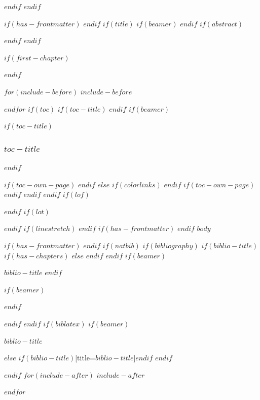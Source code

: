 \documentclass[
$if(fontsize)$
  $fontsize$,
$endif$
$if(papersize)$
  $papersize$paper,
$else$
  paper=a4,
$endif$
$if(beamer)$
  ignorenonframetext,
$if(handout)$
  handout,
$endif$
$if(aspectratio)$
  aspectratio=$aspectratio$,
$endif$
$endif$
$for(classoption)$
  $classoption$$sep$,
$endfor$
  ,captions=tableheading
]{$if(beamer)$$documentclass$$else$$if(book)$scrbook$else$scrartcl$endif$$endif$}
\newif\ifbibliography
\begin{document}
\restoregeometry
{}
$endif$
$endif$


$if(has-frontmatter)$
\frontmatter
$endif$
$if(title)$
$if(beamer)$
\frame{\titlepage}
$endif$
$if(abstract)$
\begin{abstract}
$abstract$
\end{abstract}
$endif$
$endif$

$if(first-chapter)$
\setcounter{chapter}{$first-chapter$}
\addtocounter{chapter}{-1}
$endif$

$for(include-before)$
$include-before$

$endfor$
$if(toc)$
$if(toc-title)$
\renewcommand*\contentsname{$toc-title$}
$endif$
$if(beamer)$
\begin{frame}[allowframebreaks]
$if(toc-title)$
  \frametitle{$toc-title$}
$endif$
  \tableofcontents[hideallsubsections]
\end{frame}
$if(toc-own-page)$
\newpage
$endif$
$else$
{
$if(colorlinks)$
\hypersetup{linkcolor=$if(toccolor)$$toccolor$$else$$endif$}
$endif$
\setcounter{tocdepth}{$toc-depth$}
\tableofcontents
$if(toc-own-page)$
\newpage
$endif$
}
$endif$
$endif$
$if(lof)$
\listoffigures
$endif$
$if(lot)$
\listoftables
$endif$
$if(linestretch)$
$endif$
$if(has-frontmatter)$
\mainmatter
$endif$
$body$

$if(has-frontmatter)$
\backmatter
$endif$
$if(natbib)$
$if(bibliography)$
$if(biblio-title)$
$if(has-chapters)$
\renewcommand\bibname{$biblio-title$}
$else$
\renewcommand\refname{$biblio-title$}
$endif$
$endif$
$if(beamer)$
\begin{frame}[allowframebreaks]{$biblio-title$}
  \bibliographytrue
$endif$
  
$if(beamer)$
\end{frame}
$endif$

$endif$
$endif$
$if(biblatex)$
$if(beamer)$
\begin{frame}[allowframebreaks]{$biblio-title$}
  \bibliographytrue
  \printbibliography[heading=none]
\end{frame}
$else$
\printbibliography$if(biblio-title)$[title=$biblio-title$]$endif$
$endif$

$endif$
$for(include-after)$
$include-after$

$endfor$
\end{document}
